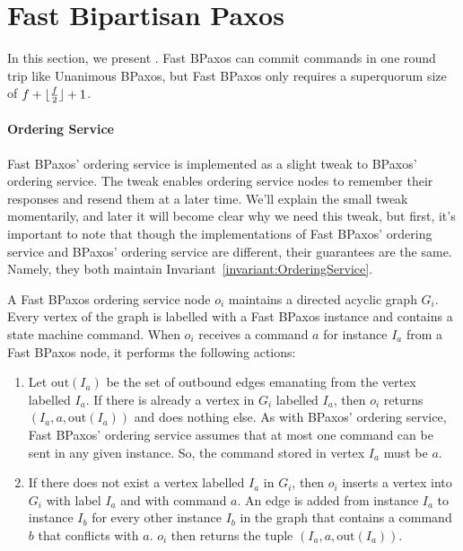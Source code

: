 \documentclass{mwhittaker}
\theoremstyle{definition}
\newcommand{\invref}[1]{Invariant~\ref{invariant:#1}}
\begin{document}
\section{Fast Bipartisan Paxos}
In this section, we present . Fast BPaxos can
commit commands in one round trip like Unanimous BPaxos, but Fast BPaxos only
requires a superquorum size of $f + \lfloor\frac{f}{2}\rfloor + 1$.

\paragraph{Ordering Service}
Fast BPaxos' ordering service is implemented as a slight tweak to BPaxos'
ordering service. The tweak enables ordering service nodes to remember their
responses and resend them at a later time. We'll explain the small tweak
momentarily, and later it will become clear why we need this tweak, but first,
it's important to note that though the implementations of Fast BPaxos' ordering
service and BPaxos' ordering service are different, their guarantees are the
same. Namely, they both maintain \invref{OrderingService}.

\newcommand{\out}{\text{out}}
A Fast BPaxos ordering service node $o_i$ maintains a directed acyclic graph
$G_i$. Every vertex of the graph is labelled with a Fast BPaxos instance and
contains a state machine command. When $o_i$ receives a command $a$ for
instance $I_a$ from a Fast BPaxos node, it performs the following actions:
\begin{enumerate}
  \item
    Let $\out(I_a)$ be the set of outbound edges emanating from the vertex
    labelled $I_a$. If there is already a vertex in $G_i$ labelled $I_a$,
    then $o_i$ returns $(I_a, a, \out(I_a))$ and does nothing else. As with
    BPaxos' ordering service, Fast BPaxos' ordering service assumes that at
    most one command can be sent in any given instance. So, the command stored
    in vertex $I_a$ must be $a$.
  \item
    If there does not exist a vertex labelled $I_a$ in $G_i$, then $o_i$
    inserts a vertex into $G_i$ with label $I_a$ and with command $a$. An edge
    is added from instance $I_a$ to instance $I_b$ for every other instance
    $I_b$ in the graph that contains a command $b$ that conflicts with $a$.
    $o_i$ then returns the tuple $(I_a, a, \out(I_a))$.
\end{enumerate}
\end{document}
